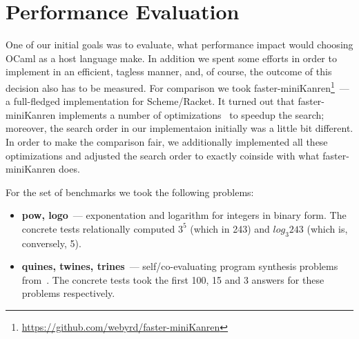 
\section{Performance Evaluation}
\label{sec:evaluation}

One of our initial goals was to evaluate, what performance impact would choosing OCaml as a host language make. In addition we spent some 
efforts in order to implement \miniKanren in an efficient, tagless manner, and, of course, the outcome of this decision also has to be 
measured. For comparison we took faster-miniKanren\footnote{\url{https://github.com/webyrd/faster-miniKanren}}~--- a full-fledged 
\miniKanren implementation for Scheme/Racket. It turned out that faster-miniKanren implements a number of optimizations~\cite{WillThesis, Optimizations} 
to speedup the search; moreover, the search order in our implementaion initially was a little bit different. In order to make the comparison
fair, we additionally implemented all these optimizations and adjusted the search order to exactly coinside with 
what faster-miniKanren does.

For the set of benchmarks we took the following problems:

\begin{itemize}
\item \textbf{pow, logo}~--- exponentation and logarithm for integers in binary form. The concrete tests relationally computed
$3^5$ (which in 243) and $log_3 243$ (which is, conversely, 5).
\item \textbf{quines, twines, trines}~--- self/co-evaluating program synthesis problems from~\cite{Untagged}. The
concrete tests took the first 100, 15 and 3 answers for these problems respectively.
\end{itemize}


